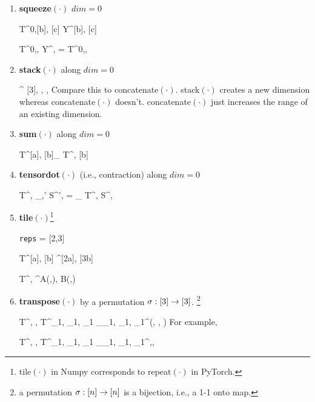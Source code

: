 \begin{enumerate}
\item {\bf squeeze$(\cdot)$} $dim=0$

\beq
T^{0,[b], [c]}
\rarrow
Y^{[b], [c]}
\eeq

\beq
T^{0,\beta, \gamma}
\rarrow
Y^{\beta, \gamma}=
T^{0,\beta, \gamma}
\eeq

\item {\bf stack$(\cdot)$} along $dim=0$

\rarrow
{}^{
[3], \alpha, \beta, \gamma}
\eeq
Compare this to concatenate$(\cdot)$. stack$(\cdot)$
creates a new dimension
whereas concatenate$(\cdot)$ doesn't. concatenate$(\cdot)$ just increases the range
of an existing dimension.

\item {\bf sum$(\cdot)$} along $dim=0$

\beq
T^{[a], [b]}\rarrow \sum_{\alp} T^{\alp, [b]}
\eeq

\item {\bf tensordot$(\cdot)$} (i.e., contraction) along $dim=0$

\rarrow
T^{\alpha, \beta}\delta_{\alpha,\alpha'} S^{\alpha',\beta}
=
\sum_\alp
T^{\alp, \beta}S^{\alp, \beta}
\eeq

\item {\bf  tile$(\cdot)$}\footnote{
tile$(\cdot)$ in Numpy corresponds
to repeat$(\cdot)$ in PyTorch.}

\beq
{\tt reps} = [2,3]
\eeq

\beq
T^{[a], [b]}\rarrow
{}
^{[2a], [3b]}
\eeq

\beq
T^{\alp, \beta}\rarrow
{}^{A(\alp,\beta), B(\alp,\beta)}
\eeq



\item {\bf transpose$(\cdot)$} by a permutation
$\sigma:[3]\rightarrow [3]$. \footnote{ a permutation $\sigma:[n] \rightarrow [n]$ is a bijection, i.e., a 1-1 onto map.}

\beq
T^{\alpha, \beta, \gamma} \rarrow T^{\alpha_1, \beta_1, \gamma_1}
\delta_{\alpha_1, \beta_1, \gamma_1}^{\sigma(\alpha, \beta, \gamma)}
\eeq
For example,

\beq
T^{\alpha, \beta, \gamma} \rarrow T^{\alpha_1, \beta_1, \gamma_1}
\delta_{\alpha_1, \beta_1, \gamma_1}^{\gamma,\beta,\alpha}
\eeq

\end{enumerate}
